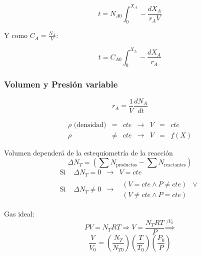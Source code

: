         \begin{equation}
        \label{eq:volumen_batch}
            t = N_{A0} \int_{0}^{X_{A}} - \frac{d X_{A}}{r_{A}V}
        \end{equation}
        
        Y como \(C_{A} = \frac{N_{A}}{V}\):
        
        \begin{equation}
        \label{eq:tiempo_rxn_batch_conc}
            t = C_{A0} \int_{0}^{X_{A}} - \frac{d X_{A}}{r_{A}}
        \end{equation}
        
        \subsubsection{Volumen y Presión variable}
        
        \[r_{A} = \frac{1}{V} \frac{dN_{A}}{dt}\]
        
            
            \[
            \begin{matrix}
                \rho \text{ (densidad)} & = & cte & \rightarrow & V & = & cte \\
                \rho & \neq & cte & \rightarrow & V & = & f(X)
            \end{matrix}
            \]
            
            
            Volumen dependerá de la estequiometría de la reacción
            \[\Delta N_{T} = \left ( \sum N_{\text{productos}} - \sum N_{\text{reactantes}} \right )\]
            \[
            \begin{matrix}
                \text{Si } & \Delta N_{T} = 0 & \rightarrow & V = cte \\
                \text{Si } & \Delta N_{T} \neq 0 & \rightarrow & 
                \begin{matrix}
                    \left ( V = cte \wedge P \neq cte \right ) & \vee \\
                    \left ( V \neq cte \wedge P = cte \right ) & 
                \end{matrix}
            \end{matrix}
            \]
            
            Gas ideal:
            \[PV = N_{T}RT \Rightarrow V = \frac{N_{T}RT}{P} \overset{/ V_{0}}{\Rightarrow}\]
            \begin{equation}
            \label{eq:razones_volumen}
                \frac{V}{V_{0}} = \left ( \frac{N_{T}}{N_{T0}} \right ) \left ( \frac{T}{T_{0}} \right ) \left ( \frac{P_{0}}{P} \right )
            \end{equation}
            
